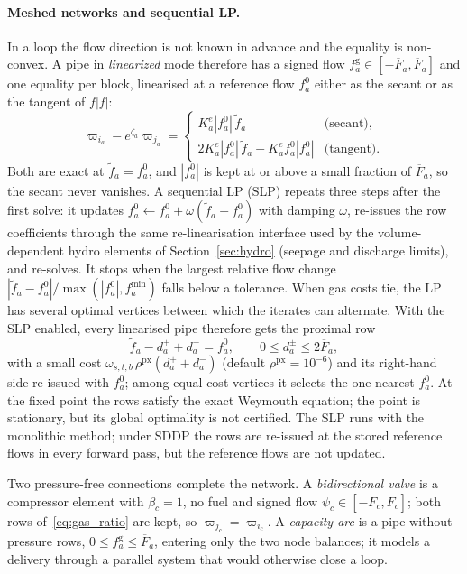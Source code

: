 \paragraph{Meshed networks and sequential LP.}
In a loop the flow direction is not known in advance and the equality
is non-convex.  A pipe in \emph{linearized} mode therefore has a signed
flow $f^{\mathrm{g}}_a \in [-\overline{F}_a, \overline{F}_a]$ and one
equality per block, linearised at a reference flow $f^0_a$ either as
the secant or as the tangent of $f|f|$:
\begin{equation}
\label{eq:gas_linearized}
\varpi_{i_a} - e^{\zeta_a}\varpi_{j_a} =
\begin{cases}
K^e_a |f^0_a|\,\tilde f_a & \text{(secant)},\\
2K^e_a|f^0_a|\,\tilde f_a - K^e_a f^0_a|f^0_a| & \text{(tangent)}.
\end{cases}
\end{equation}
Both are exact at $\tilde f_a = f^0_a$, and $|f^0_a|$ is kept at or
above a small fraction of $\overline{F}_a$, so the secant never
vanishes.  A sequential LP (SLP) repeats
three steps after the first solve: it updates
$f^0_a \leftarrow f^0_a + \omega (\tilde f_a - f^0_a)$ with damping
$\omega$, re-issues the row coefficients through the same
re-linearisation interface used by the volume-dependent hydro elements
of Section~\ref{sec:hydro} (seepage and discharge limits), and
re-solves.  It stops when the largest
relative flow change $|\tilde f_a - f^0_a| / \max(|f^0_a|, f^{\min}_a)$
falls below a tolerance.  When gas costs tie, the LP has several
optimal vertices between which the iterates can alternate.  With the
SLP enabled, every linearised pipe therefore gets the proximal row
\begin{equation}
\label{eq:gas_proximal}
\tilde f_a - d^+_a + d^-_a = f^0_a ,
\qquad 0 \leq d^\pm_a \leq 2\overline{F}_a ,
\end{equation}
with a small cost $\omega_{s,t,b}\,\rho^{\mathrm{px}}(d^+_a + d^-_a)$
(default $\rho^{\mathrm{px}} = 10^{-6}$) and its right-hand side
re-issued with $f^0_a$; among equal-cost vertices it selects the one
nearest $f^0_a$.  At the
fixed point the rows satisfy the exact Weymouth equation; the point is
stationary, but its global optimality is not certified.  The SLP runs
with the monolithic method; under SDDP the rows are re-issued at the
stored reference flows in every forward pass, but the reference flows
are not updated.

Two pressure-free connections complete the network.  A
\emph{bidirectional valve} is a compressor element with
$\overline{\beta}_c = 1$, no fuel and signed flow
$\psi_c \in [-\overline{F}_c, \overline{F}_c]$; both rows
of~\eqref{eq:gas_ratio} are kept, so $\varpi_{j_c} = \varpi_{i_c}$.  A
\emph{capacity arc} is a pipe without pressure rows,
$0 \leq f^{\mathrm{g}}_a \leq \overline{F}_a$, entering only the two
node balances; it models a delivery through a parallel system that would
otherwise close a loop.

